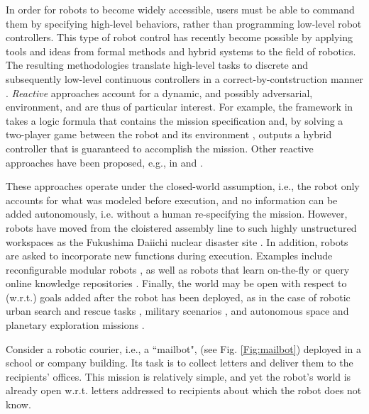 In order for robots to become widely accessible, users must be able to command them by specifying high-level behaviors, rather than programming low-level robot controllers.
This type of robot control has recently become possible by applying tools and ideas from formal methods and hybrid systems to the field of robotics. The resulting methodologies translate high-level tasks to discrete and subsequently low-level continuous controllers in a correct-by-contstruction manner \cite{BBEFKP06, KGFP_TRO09, KaramanCDC2009, Wongpiromsarn2010, LaValleRSS2011, BhatiaRAM2011, Belta2013RSS}.
\emph{Reactive} approaches account for a dynamic, and possibly adversarial, environment, and are thus of particular interest. For example, the framework in \cite{KGFP_TRO09} takes a logic formula that contains the mission specification and, by solving a two-player game between the robot and its environment \cite{piterman_06}, outputs a hybrid controller that is guaranteed to accomplish the mission. Other reactive approaches have been proposed, e.g., in \cite{Wongpiromsarn2010} and \cite{Belta2013RSS}.

These approaches operate under the closed-world assumption, i.e., the robot only accounts for what was modeled before execution, and no information can be added autonomously, i.e. without a human re-specifying the mission.
However, robots have moved from the cloistered assembly line to such highly unstructured workspaces as the Fukushima Daiichi nuclear disaster site \cite{Fukushima2011}. 
In addition, robots are asked to incorporate new functions during execution. 
Examples include reconfigurable modular robots \cite{ModularIROS2011}, as well as robots that learn on-the-fly \cite{SaxenaIJRR2012} or query online knowledge repositories \cite{rapyuta2013}. 
Finally, the world may be open with respect to (w.r.t.) goals added after the robot has been deployed, as in the case of robotic urban search and rescue tasks \cite{MatthiasAI2010}, military scenarios \cite{gda2013}, and autonomous space and planetary exploration missions \cite{spaceXplore2006}. 

\begin{myExample}\label{Ex:mailbot1}
Consider a robotic courier, i.e., a ``mailbot", (see Fig. \ref{Fig:mailbot}) deployed in a school or company building. 
Its task is to collect letters and deliver them to the recipients' offices. 
This mission is relatively simple, and yet the robot's world is already open w.r.t. letters addressed to recipients about which the robot does not know. %
\end{myExample}

